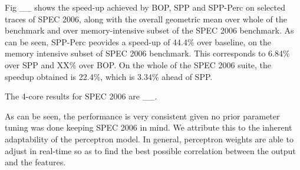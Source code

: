 Fig \_\_ shows the speed-up achieved by BOP, SPP and SPP-Perc on
selected traces of SPEC 2006, along with the overall geometric mean
over whole of the benchmark and over memory-intensive subset of the
SPEC 2006 benchmark.  As can be seen, SPP-Perc peovides a speed-up of
44.4\% over baseline, on the memory intensive subset of SPEC 2006
benchmark.  This corresponds to 6.84\% over SPP and XX\% over BOP.  On
the whole of the SPEC 2006 suite, the speedup obtained is 22.4\%,
which is 3.34\% ahead of SPP.

The 4-core results for SPEC 2006 are \_\_.

As can be seen, the performance is very consistent given no prior
parameter tuning was done keeping SPEC 2006 in mind.  We attribute
this to the inherent adaptability of the perceptron model.  In
general, perceptron weights are able to adjust in real-time so as to
find the best possible correlation between the output and the
features.
